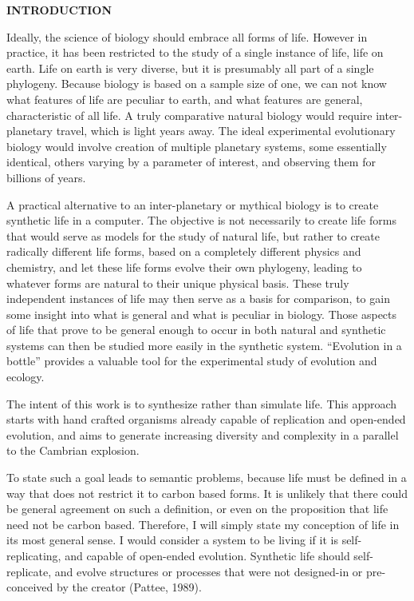 \large \bf INTRODUCTION\rm \normalsize
\eLP

Ideally, the science of biology should embrace all forms of life.  However
in practice, it has been restricted to the study of a single instance of
life, life on earth.  Life on earth is very diverse, but it is presumably
all part of a single phylogeny.  Because biology is based on a sample size
of one, we can not know what features of life are peculiar to earth, and
what features are general, characteristic of all life.  A truly comparative
natural biology would require inter-planetary travel, which is light
years away.  The ideal experimental evolutionary biology would involve
creation of multiple planetary systems, some essentially identical,
others varying by a parameter of interest, and observing them for billions
of years.

A practical alternative to an inter-planetary or mythical biology is to
create synthetic life in a computer.  The objective is not necessarily
to create life forms that would serve as models for the study of natural
life, but rather to create radically different life forms, based on a
completely different physics and chemistry, and let these life forms
evolve their own phylogeny, leading to whatever forms are natural to their
unique physical basis.  These truly independent instances of life may
then serve as a basis for comparison, to gain some insight into what is
general and what is peculiar in biology.  Those aspects of life that prove
to be general enough to occur in both natural and synthetic systems can then
be studied more easily in the synthetic system.  ``Evolution in a bottle''
provides a valuable tool for the experimental study of evolution and ecology.

The intent of this work is to synthesize rather than simulate life.  This
approach starts with hand crafted organisms already capable of replication
and open-ended evolution, and aims to generate increasing diversity and
complexity in a parallel to the Cambrian explosion.

To state such a goal leads to semantic problems, because life must be
defined in a way that does not restrict it to carbon based forms.  It is
unlikely that there could be general agreement on such a definition, or
even on the proposition that life need not be carbon based.  Therefore,
I will simply state my conception of life in its most general sense.  I
would consider a system to be living if it is self-replicating, and
capable of open-ended evolution.  Synthetic life should self-replicate,
and evolve structures or processes that were not designed-in or
pre-conceived by the creator (Pattee, 1989).

